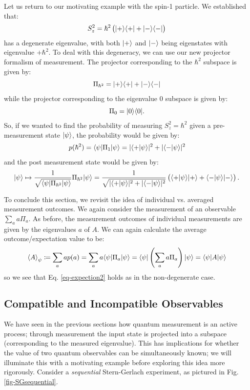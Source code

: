 Let us return to our motivating example with the spin-1 particle. We established that:
\begin{equation}
    S_z^2 = \hbar^2\left(\lvert + \rangle \langle + \rvert + \lvert - \rangle \langle - \rvert\right)
\end{equation}
has a degenerate eigenvalue, with both $\lvert + \rangle$ and $\lvert - \rangle$ being eigenstates with eigenvalue $+\hbar^2$. To deal with this degeneracy, we can use our new projector formalism of measurement. The projector corresponding to the $\hbar^2$ subspace is given by:
\begin{equation}
    \Pi_{\hbar^2} = \lvert + \rangle \langle + \rvert + \lvert - \rangle \langle - \rvert
\end{equation}
while the projector corresponding to the eigenvalue $0$ subspace is given by:
\begin{equation}
    \Pi_0 = \lvert 0 \rangle \langle 0 \rvert.
\end{equation}
So, if we wanted to find the probability of measuring $S_z^2 = \hbar^2$ given a pre-measurement state $\lvert \psi \rangle$, the probability would be given by:
\begin{equation}
    p(\hbar^2) = \langle \psi \rvert\Pi_1\lvert \psi \rangle = \lvert \langle + \lvert \psi \rangle \rvert^2 + \lvert \langle - \lvert \psi \rangle \rvert^2
\end{equation}
and the post measurement state would be given by:
\begin{equation}
    \lvert \psi \rangle \mapsto \frac{1}{\sqrt{\langle \psi \rvert\Pi_{\hbar^2}\lvert \psi \rangle}}\Pi_{\hbar^2}\lvert \psi \rangle = \frac{1}{\sqrt{\lvert \langle + \lvert \psi \rangle \rvert^2 + \lvert \langle - \lvert \psi \rangle \rvert^2}}\left(\langle + \lvert \psi \rangle\lvert + \rangle + \langle - \lvert \psi \rangle\lvert - \rangle\right).
\end{equation}

To conclude this section, we revisit the idea of individual vs. averaged measurement outcomes. We again consider the measurement of an observable $\sum_a a \Pi_a$. As before, the measurement outcomes of individual measurements are given by the eigenvalues $a$ of $A$. We can again calculate the average outcome/expectation value to be:
\begin{equation}
    \left< A \right>_\psi \coloneqq \sum_a a p(a) = \sum_a a \langle \psi \rvert\Pi_a \lvert \psi \rangle = \langle \psi \rvert \left(\sum_a a \Pi_a \right) \lvert \psi \rangle = \langle \psi \rvert A\lvert \psi \rangle
\end{equation}
so we see that Eq. \eqref{eq-expection2} holds as in the non-degenerate case.

\subsection{Compatible and Incompatible Observables}
We have seen in the previous sections how quantum measurement is an active process; through measurement the input state is projected into a subspace (corresponding to the measured eigenvalue). This has implications for whether the value of two quantum observables can be simultaneously known; we will illuminate this with a motivating example before exploring this idea more rigorously. Consider a \emph{sequential} Stern-Gerlach experiment, as pictured in Fig. \ref{fig-SGsequential}.

